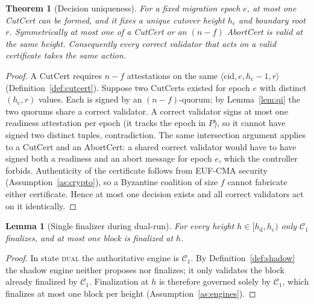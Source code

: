 \documentclass[journal]{IEEEtran}
\newtheorem{theorem}{Theorem}
\newtheorem{lemma}{Lemma}
\begin{document}
\begin{theorem}[Decision uniqueness]
\label{th:unique}
For a fixed migration epoch $e$, at most one CutCert can be formed, and it fixes a unique
cutover height $h_{\mathrm{c}}$ and boundary root $r$. Symmetrically at most one of a CutCert
or an $(n-f)$ AbortCert is valid at the same height. Consequently every correct validator that
acts on a valid certificate takes the same action.
\end{theorem}
\begin{proof}
A CutCert requires $n-f$ attestations on the same $\langle\mathrm{cid},e,h_{\mathrm{c}}-1,r\rangle$
(Definition~\ref{def:cutcert}). Suppose two CutCerts existed for epoch $e$ with distinct
$(h_{\mathrm{c}},r)$ values. Each is signed by an $(n-f)$-quorum; by Lemma~\ref{lem:qi} the two
quorums share a correct validator. A correct validator signs at most one readiness attestation
per epoch (it tracks the epoch in $P$), so it cannot have signed two distinct tuples,
contradiction. The same intersection argument applies to a CutCert and an AbortCert: a shared
correct validator would have to have signed both a readiness and an abort message for epoch
$e$, which the controller forbids. Authenticity of the certificate follows from EUF-CMA
security (Assumption~\ref{as:crypto}), so a Byzantine coalition of size $f$ cannot fabricate
either certificate. Hence at most one decision exists and all correct validators act on it
identically.
\end{proof}

\begin{lemma}[Single finalizer during dual-run]
\label{lem:single}
For every height $h\in[h_{\mathrm{d}},h_{\mathrm{c}})$ only $\mathcal{C}_1$ finalizes, and at
most one block is finalized at $h$.
\end{lemma}
\begin{proof}
In state \textsc{dual} the authoritative engine is $\mathcal{C}_1$. By
Definition~\ref{def:shadow} the shadow engine neither proposes nor finalizes; it only validates
the block already finalized by $\mathcal{C}_1$. Finalization at $h$ is therefore governed solely
by $\mathcal{C}_1$, which finalizes at most one block per height (Assumption~\ref{as:engines}).
\end{proof}
\end{document}

